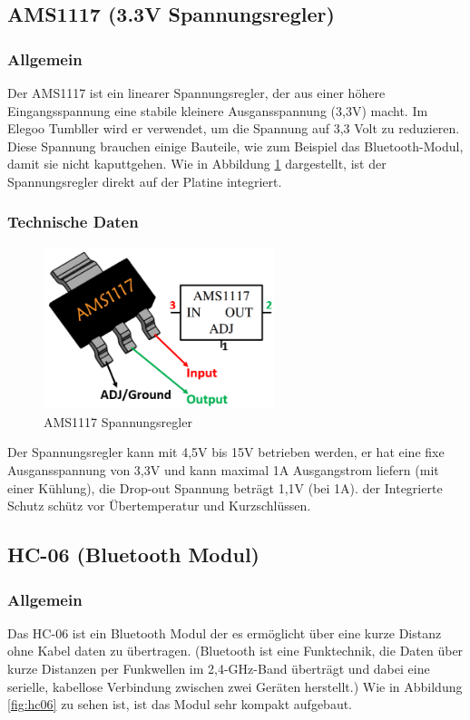 \subsection{AMS1117 (3.3V Spannungsregler)}
%
\subsubsection{Allgemein}
Der AMS1117 ist ein linearer Spannungsregler, der aus einer höhere Eingangsspannung eine stabile kleinere Ausgansspannung (3,3V) macht. Im Elegoo Tumbller wird er verwendet, um die Spannung auf 3,3 Volt zu reduzieren. Diese Spannung brauchen einige Bauteile, wie zum Beispiel das Bluetooth-Modul, damit sie nicht kaputtgehen. Wie in Abbildung \ref{fig:ams1117} dargestellt, ist der Spannungsregler direkt auf der Platine integriert.
\subsubsection{Technische Daten}
\begin{figure}[H]
    \centering
    \includegraphics[width=0.6\textwidth]{img/Hardware/AMS1117.png}
    \caption{AMS1117 Spannungsregler}
    \label{fig:ams1117}
\end{figure}
Der Spannungsregler kann mit 4,5V bis 15V betrieben werden, er hat eine fixe Ausgansspannung von 3,3V und kann maximal 1A Ausgangstrom liefern (mit einer Kühlung), 
die Drop-out Spannung beträgt 1,1V (bei 1A). der Integrierte Schutz schütz vor Übertemperatur und Kurzschlüssen.
%
\subsection{HC-06 (Bluetooth Modul)}
%
\subsubsection{Allgemein}
Das HC-06 ist ein Bluetooth Modul der es ermöglicht über eine kurze Distanz ohne Kabel daten zu übertragen. (Bluetooth ist eine Funktechnik, die Daten über kurze Distanzen per Funkwellen im 2,4-GHz-Band überträgt und dabei eine serielle, kabellose Verbindung zwischen zwei Geräten herstellt.) Wie in Abbildung \ref{fig:hc06} zu sehen ist, ist das Modul sehr kompakt aufgebaut.
